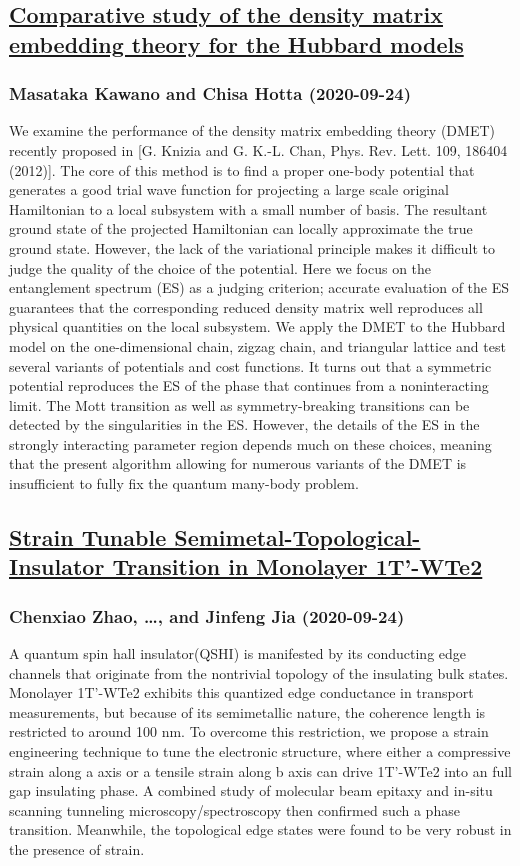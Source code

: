 \subsection*{\href{http://arxiv.org/abs/2009.11477v1}{Comparative study of the density matrix embedding theory for the Hubbard  models}}
\subsubsection*{Masataka Kawano and Chisa Hotta (2020-09-24)}
We examine the performance of the density matrix embedding theory (DMET)
recently proposed in [G. Knizia and G. K.-L. Chan, Phys. Rev. Lett. 109, 186404
(2012)]. The core of this method is to find a proper one-body potential that
generates a good trial wave function for projecting a large scale original
Hamiltonian to a local subsystem with a small number of basis. The resultant
ground state of the projected Hamiltonian can locally approximate the true
ground state. However, the lack of the variational principle makes it difficult
to judge the quality of the choice of the potential. Here we focus on the
entanglement spectrum (ES) as a judging criterion; accurate evaluation of the
ES guarantees that the corresponding reduced density matrix well reproduces all
physical quantities on the local subsystem. We apply the DMET to the Hubbard
model on the one-dimensional chain, zigzag chain, and triangular lattice and
test several variants of potentials and cost functions. It turns out that a
symmetric potential reproduces the ES of the phase that continues from a
noninteracting limit. The Mott transition as well as symmetry-breaking
transitions can be detected by the singularities in the ES. However, the
details of the ES in the strongly interacting parameter region depends much on
these choices, meaning that the present algorithm allowing for numerous
variants of the DMET is insufficient to fully fix the quantum many-body
problem.

\subsection*{\href{http://arxiv.org/abs/2009.11472v1}{Strain Tunable Semimetal-Topological-Insulator Transition in Monolayer  1T'-WTe2}}
\subsubsection*{Chenxiao Zhao, \dots, and Jinfeng Jia (2020-09-24)}
A quantum spin hall insulator(QSHI) is manifested by its conducting edge
channels that originate from the nontrivial topology of the insulating bulk
states. Monolayer 1T'-WTe2 exhibits this quantized edge conductance in
transport measurements, but because of its semimetallic nature, the coherence
length is restricted to around 100 nm. To overcome this restriction, we propose
a strain engineering technique to tune the electronic structure, where either a
compressive strain along a axis or a tensile strain along b axis can drive
1T'-WTe2 into an full gap insulating phase. A combined study of molecular beam
epitaxy and in-situ scanning tunneling microscopy/spectroscopy then confirmed
such a phase transition. Meanwhile, the topological edge states were found to
be very robust in the presence of strain.

